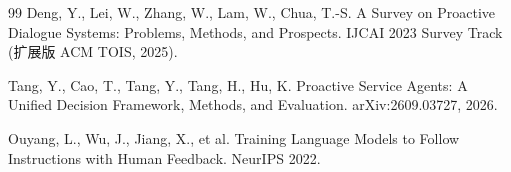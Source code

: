 \documentclass[11pt,a4paper]{ctexart}
\begin{document}
\begin{thebibliography}{99}
 Deng, Y., Lei, W., Zhang, W., Lam, W., Chua, T.-S. A Survey on Proactive Dialogue Systems: Problems, Methods, and Prospects. IJCAI 2023 Survey Track (扩展版 ACM TOIS, 2025).

 Tang, Y., Cao, T., Tang, Y., Tang, H., Hu, K. Proactive Service Agents: A Unified Decision Framework, Methods, and Evaluation. arXiv:2609.03727, 2026.

 Ouyang, L., Wu, J., Jiang, X., et al. Training Language Models to Follow Instructions with Human Feedback. NeurIPS 2022.

\end{thebibliography}
\end{document}
